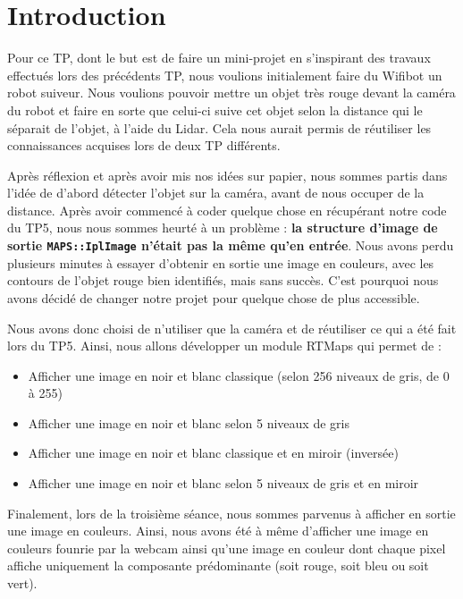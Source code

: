 \chapter{Introduction}

Pour ce TP, dont le but est de faire un mini-projet en s'inspirant des travaux effectués lors des précédents TP, nous voulions initialement faire du Wifibot un robot suiveur. Nous voulions pouvoir mettre un objet très rouge devant la caméra du robot et faire en sorte que celui-ci suive cet objet selon la distance qui le séparait de l'objet, à l'aide du Lidar. Cela nous aurait permis de réutiliser les connaissances acquises lors de deux TP différents.

\bigskip

Après réflexion et après avoir mis nos idées sur papier, nous sommes partis dans l'idée de d'abord détecter l'objet sur la caméra, avant de nous occuper de la distance. Après avoir commencé à coder quelque chose en récupérant notre code du TP5, nous nous sommes heurté à un problème : \textbf{la structure d'image de sortie \lstinline{MAPS::IplImage} n'était pas la même qu'en entrée}. Nous avons perdu plusieurs minutes à essayer d'obtenir en sortie une image en couleurs, avec les contours de l'objet rouge bien identifiés, mais sans succès. C'est pourquoi nous avons décidé de changer notre projet pour quelque chose de plus accessible.

\bigskip

Nous avons donc choisi de n'utiliser que la caméra et de réutiliser ce qui a été fait lors du TP5. Ainsi, nous allons développer un module RTMaps qui permet de :
\begin{itemize}
  \item Afficher une image en noir et blanc classique (selon 256 niveaux de gris, de 0 à 255)
  \item Afficher une image en noir et blanc selon 5 niveaux de gris
  \item Afficher une image en noir et blanc classique et \og en miroir\fg{} (inversée)
  \item Afficher une image en noir et blanc selon 5 niveaux de gris et \og en miroir\fg{}
\end{itemize}

\bigskip

Finalement, lors de la troisième séance, nous sommes parvenus à afficher en sortie une image en couleurs. Ainsi, nous avons été à même d'afficher une image en couleurs founrie par la webcam ainsi qu'une image en couleur dont chaque pixel affiche uniquement la composante prédominante (soit rouge, soit bleu ou soit vert).